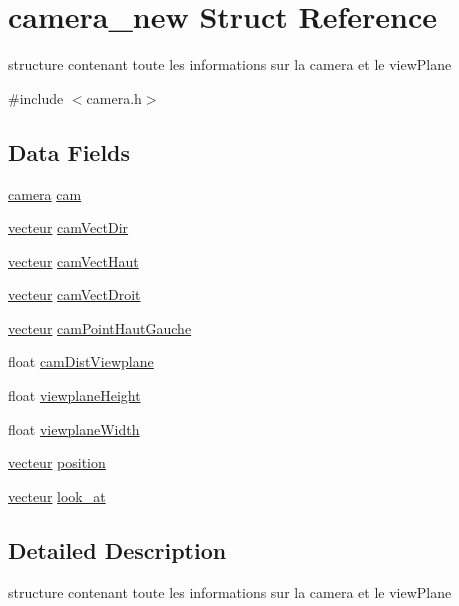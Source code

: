 \hypertarget{structcamera__new}{
\section{camera\_\-new Struct Reference}
\label{structcamera__new}
}


structure contenant toute les informations sur la camera et le viewPlane  




{\ttfamily \#include $<$camera.h$>$}

\subsection*{Data Fields}
\begin{DoxyCompactItemize}
\item 
\hyperlink{structcamera}{camera} \hyperlink{structcamera__new_a16ecffc15a7a4163203346c420ba58f6}{cam}
\item 
\hyperlink{structvecteur}{vecteur} \hyperlink{structcamera__new_a6873067a7702a2c4824cb85694036163}{camVectDir}
\item 
\hyperlink{structvecteur}{vecteur} \hyperlink{structcamera__new_a507bea91a4e3c76be59cec90cd2f9937}{camVectHaut}
\item 
\hyperlink{structvecteur}{vecteur} \hyperlink{structcamera__new_ab3a4002e1ae75a9133367b3dda70ee14}{camVectDroit}
\item 
\hyperlink{structvecteur}{vecteur} \hyperlink{structcamera__new_ae73d110605e87ba94ec370139f28651a}{camPointHautGauche}
\item 
float \hyperlink{structcamera__new_a3ae08eef6550dcb69bb2b49bc0dc8f63}{camDistViewplane}
\item 
float \hyperlink{structcamera__new_af0d7fe0f1f6fbd0fe663b08e654f2003}{viewplaneHeight}
\item 
float \hyperlink{structcamera__new_ade7aec9f255cba52f6e841ba18090507}{viewplaneWidth}
\item 
\hyperlink{structvecteur}{vecteur} \hyperlink{structcamera__new_ae5fd54bf7be876724364bedfe8624307}{position}
\item 
\hyperlink{structvecteur}{vecteur} \hyperlink{structcamera__new_ad7647430b05d8095b7d29aa66b7bfb1a}{look\_\-at}
\end{DoxyCompactItemize}


\subsection{Detailed Description}
structure contenant toute les informations sur la camera et le viewPlane 

